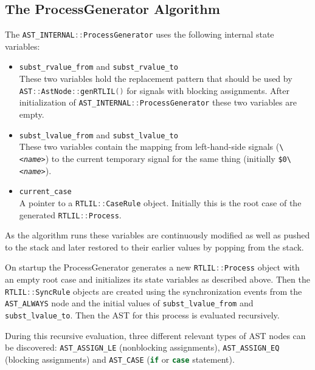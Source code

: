 \subsection{The ProcessGenerator Algorithm}

The \lstinline[language=C++]{AST_INTERNAL::ProcessGenerator} uses the following internal state variables:

\begin{itemize}
\item \begin{sloppypar}
\lstinline[language=C++]{subst_rvalue_from} and \lstinline[language=C++]{subst_rvalue_to} \\
These two variables hold the replacement pattern that should be used by \lstinline[language=C++]{AST::AstNode::genRTLIL()}
for signals with blocking assignments. After initialization of \lstinline[language=C++]{AST_INTERNAL::ProcessGenerator}
these two variables are empty.
\end{sloppypar}
%
\item \lstinline[language=C++]{subst_lvalue_from} and \lstinline[language=C++]{subst_lvalue_to} \\
These two variables contain the mapping from left-hand-side signals ({\tt \textbackslash \it <name>}) to the current
temporary signal for the same thing (initially {\tt \$0\textbackslash \it <name>}).
%
\item \lstinline[language=C++]{current_case} \\
A pointer to a \lstinline[language=C++]{RTLIL::CaseRule} object. Initially this is the root case of the
generated \lstinline[language=C++]{RTLIL::Process}.
\end{itemize}

As the algorithm runs these variables are continuously modified as well as pushed
to the stack and later restored to their earlier values by popping from the stack.

On startup the ProcessGenerator generates a new
\lstinline[language=C++]{RTLIL::Process} object with an empty root case and
initializes its state variables as described above. Then the \lstinline[language=C++]{RTLIL::SyncRule} objects
are created using the synchronization events from the {\tt AST\_ALWAYS} node and the initial values of
\lstinline[language=C++]{subst_lvalue_from} and \lstinline[language=C++]{subst_lvalue_to}. Then the
AST for this process is evaluated recursively.

During this recursive evaluation, three different relevant types of AST nodes can be discovered:
{\tt AST\_ASSIGN\_LE} (nonblocking assignments), {\tt AST\_ASSIGN\_EQ} (blocking assignments) and
{\tt AST\_CASE} (\lstinline[language=Verilog]{if} or \lstinline[language=Verilog]{case} statement).


